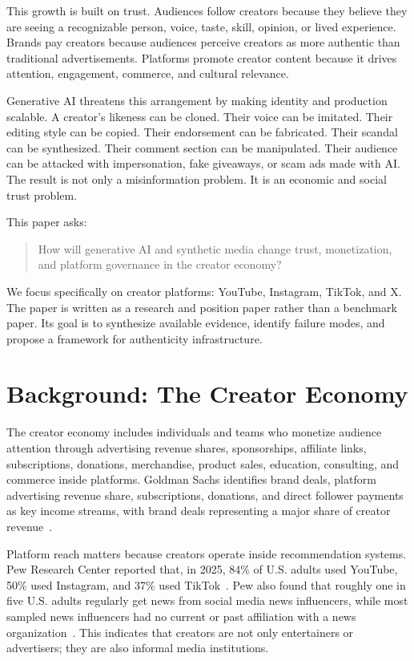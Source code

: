 \documentclass[11pt]{article}
\begin{document}
This growth is built on trust. Audiences follow creators because they believe they are seeing a recognizable person, voice, taste, skill, opinion, or lived experience. Brands pay creators because audiences perceive creators as more authentic than traditional advertisements. Platforms promote creator content because it drives attention, engagement, commerce, and cultural relevance.

Generative AI threatens this arrangement by making identity and production scalable. A creator's likeness can be cloned. Their voice can be imitated. Their editing style can be copied. Their endorsement can be fabricated. Their scandal can be synthesized. Their comment section can be manipulated. Their audience can be attacked with impersonation, fake giveaways, or scam ads made with AI. The result is not only a misinformation problem. It is an economic and social trust problem.

This paper asks:

\begin{quote}
How will generative AI and synthetic media change trust, monetization, and platform governance in the creator economy?
\end{quote}

We focus specifically on creator platforms: YouTube, Instagram, TikTok, and X. The paper is written as a research and position paper rather than a benchmark paper. Its goal is to synthesize available evidence, identify failure modes, and propose a framework for authenticity infrastructure.

\section{Background: The Creator Economy}

The creator economy includes individuals and teams who monetize audience attention through advertising revenue shares, sponsorships, affiliate links, subscriptions, donations, merchandise, product sales, education, consulting, and commerce inside platforms. Goldman Sachs identifies brand deals, platform advertising revenue share, subscriptions, donations, and direct follower payments as key income streams, with brand deals representing a major share of creator revenue~\cite{goldman2023creator}.

Platform reach matters because creators operate inside recommendation systems. Pew Research Center reported that, in 2025, 84\% of U.S. adults used YouTube, 50\% used Instagram, and 37\% used TikTok~\cite{pew2025social}. Pew also found that roughly one in five U.S. adults regularly get news from social media news influencers, while most sampled news influencers had no current or past affiliation with a news organization~\cite{pew2025influencers}. This indicates that creators are not only entertainers or advertisers; they are also informal media institutions.
\end{document}
